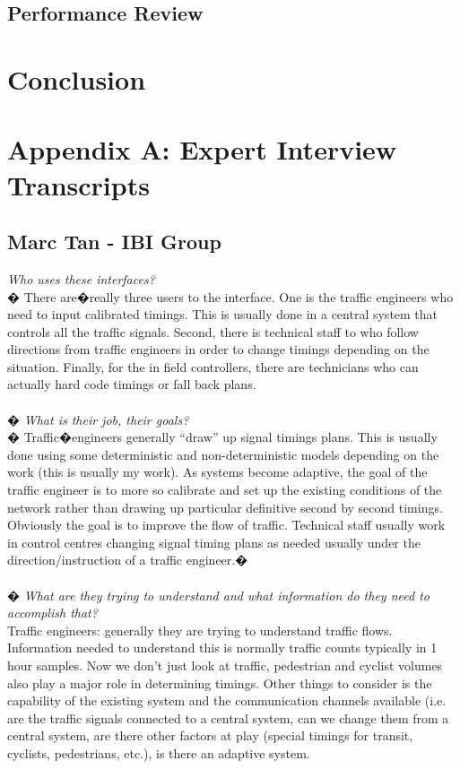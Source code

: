 \documentclass{report}
\begin{document}
\subsection{Performance Review}

\newpage
\section{Conclusion}

\newpage
\section{Appendix A: Expert Interview Transcripts}
\subsection{Marc Tan - IBI Group}
\emph{Who uses these interfaces?} \\
�
There are�really three users to the interface.
One is the traffic engineers who need to input calibrated timings.
This is usually done in a central system that controls all the traffic signals.
Second, there is technical staff to who follow directions from traffic engineers in order to change timings depending on the situation.
Finally, for the in field controllers, there are technicians who can actually hard code timings or fall back plans. \\ \\
�
\emph{What is their job, their goals?} \\
�
Traffic�engineers generally ``draw'' up signal timings plans.
This is usually done using some deterministic and non-deterministic models depending on the work (this is usually my work).
As systems become adaptive, the goal of the traffic engineer is to more so calibrate and set up the existing conditions of the network rather than drawing up particular definitive second by second timings.
Obviously the goal is to improve the flow of traffic.
Technical staff usually work in control centres changing signal timing plans as needed usually under the direction/instruction of a traffic engineer.�\\ \\
�
\emph{What are they trying to understand and what information do they need to accomplish that?} \\ 
Traffic engineers: generally they are trying to understand traffic flows.
Information needed to understand this is normally traffic counts typically in 1 hour samples.
Now we don't just look at traffic, pedestrian and cyclist volumes also play a major role in determining timings.
Other things to consider is the capability of the existing system and the communication channels available (i.e. are the traffic signals connected to a central system, can we change them from a central system, are there other factors at play (special timings for transit, cyclists, pedestrians, etc.), is there an adaptive system.
\end{document}
